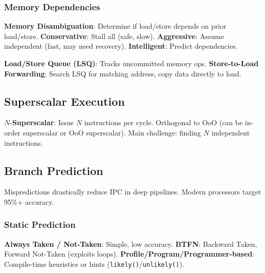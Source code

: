 \subsubsection{Memory Dependencies}

\begin{definition}
	\textbf{Memory Disambiguation}: Determine if load/store depends on prior load/store.
	\textbf{Conservative}: Stall all (safe, slow). \textbf{Aggressive}: Assume independent (fast, may need recovery). \textbf{Intelligent}: Predict dependencies.
\end{definition}

\begin{definition}
	\textbf{Load/Store Queue (LSQ)}: Tracks uncommitted memory ops.
	\textbf{Store-to-Load Forwarding}: Search LSQ for matching address, copy data directly to load.
\end{definition}

\subsection{Superscalar Execution}

\begin{definition}
	$N$-\textbf{Superscalar}: Issue $N$ instructions per cycle. Orthogonal to OoO (can be in-order superscalar or OoO superscalar). Main challenge: finding $N$ independent instructions.
\end{definition}

\subsection{Branch Prediction}

\begin{remark}
	Mispredictions drastically reduce IPC in deep pipelines. Modern processors target 95\%+ accuracy.
\end{remark}

\subsubsection{Static Prediction}

\begin{definition}
	\textbf{Always Taken / Not-Taken}: Simple, low accuracy.
	\textbf{BTFN}: Backward Taken, Forward Not-Taken (exploits loops).
	\textbf{Profile/Program/Programmer-based}: Compile-time heuristics or hints (\texttt{likely()}/\texttt{unlikely()}).
\end{definition}

